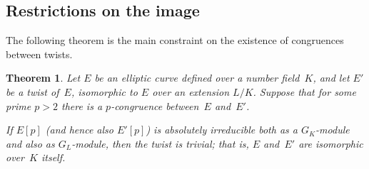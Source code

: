 \documentclass[12pt, reqno]{amsart}
\newcommand{\F}{\mathbb{F}}
\newcommand{\PP}{\mathbb{P}}
\newcommand{\rhobar}{{\overline{\rho}}}
\newcommand{\PSL}{\operatorname{PSL}}
\numberwithin{equation}{section}
\newtheorem{theorem}{Theorem}[section]
\theoremstyle{definition}
\theoremstyle{remark}
\begin{document}
\begin{comment}
Define $\left<\; , \right>:A\times A\to \mu_p$ to be the pairing which
under our identification $A\cong E[p]$ corresponds to the Weil
pairing.  This is $\F_p$-bilinear and alternating.  For all $x,y\in A$
and~$a\in A^{\times}$ we have $\left<ax,ay\right> =
\left<x,y\right>^{N(a)}$, where $N(a)=a\overline{a}$ is the norm map
from~$A$ to~$\F_p$.  This follows from the $\F_p$-linearity of
multiplication by~$a$, together with the facts that the pairing is
alternating and that (by definition) $N(a)$ is the determinant of
multiplication by~$a$.  Taking $a=\rd$ we have $N(\rd)=-\delta$, and we see
that $\left<\rd x,\rd y\right> = \left<x,y\right>^{-\delta}$, and
hence that $e_p(s(P),s(Q)) = e_p(P,Q)^{-\delta}$ for all $P,Q\in
E[p]$, as required.


(2) Since the determinant of $\rhobar_{E,p}$ is the mod~$p$ cyclotomic
character, we have $\PP\rhobar_{E,p}(G_K)\subseteq \PSL_2(\F_p)$ if
and only if $\sqrt{p^*}\in K$.  When this is the case, by
Lemma~\ref{L:C2xC2} we see that each index~$2$ subgroup of the
projective image is split when $p\equiv1\pmod4$ and each is non-split
when $p\equiv3\pmod4$.  By part (2), it follows in both cases that the
congruences between~$E$ and each of the three twists are all
symplectic.

Now suppose that $\sqrt{p^*}\notin K$.  By Lemma~\ref{L:C2xC2} again,
exactly one of the three subgroups is split when $p\equiv1\pmod4$, and
exactly one is non-split when $p\equiv3\pmod4$, so in both cases
exactly one congruence is symplectic.  Moreover, since the subgroup
$C$ inducing the symplectic congruence is the unique one contained in
$\PSL_2(\F_p)$, the associated quadratic extension is~$K(\sqrt{p^*})$.
\end{proof}
\end{comment}


\subsection{Restrictions on the image}
The following theorem is the main constraint on the existence of congruences between twists.

\begin{theorem} \label{T:constraint}
Let $E$ be an elliptic curve defined over a number field~$K$, and let
$E'$ be a twist of~$E$, isomorphic to $E$ over an extension $L/K$.
Suppose that for some prime $p>2$ there is a $p$-congruence
between~$E$ and~$E'$.

If $E[p]$ (and hence also $E'[p]$) 
is absolutely irreducible 
both as a
$G_K$-module and also as $G_L$-module, then the twist is trivial; that
is, $E$ and~$E'$ are isomorphic over~$K$ itself.
\end{theorem}
\end{document}
